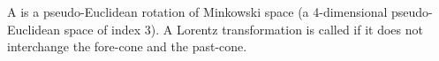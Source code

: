 A  is a pseudo-Euclidean rotation of Minkowski space (a 4-dimensional pseudo-Euclidean space of index 3). A Lorentz transformation is called  if it does not interchange the fore-cone and the past-cone.
